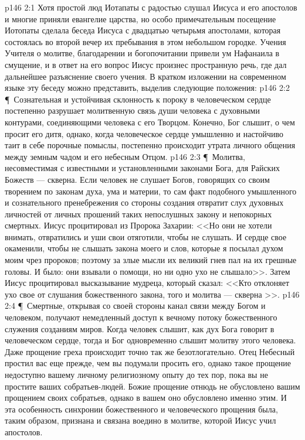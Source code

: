 \vs p146 2:1 Хотя простой люд Иотапаты с радостью слушал Иисуса и его апостолов и многие приняли евангелие царства, но особо примечательным посещение Иотопаты сделала беседа Иисуса с двадцатью четырьмя апостолами, которая состоялась во второй вечер их пребывания в этом небольшом городке. Учения Учителя о молитве, благодарении и богопочитании привели ум Нафанаила в смущение, и в ответ на его вопрос Иисус произнес пространную речь, где дал дальнейшее разъяснение своего учения. В кратком изложении на современном языке эту беседу можно представить, выделив следующие положения:
\vs p146 2:2 \P\ \bibnobreakspace Сознательная и устойчивая склонность к пороку в человеческом сердце постепенно разрушает молитвенную связь души человека с духовными контурами, соединяющими человека с его Творцом. Конечно, Бог слышит, о чем просит его дитя, однако, когда человеческое сердце умышленно и настойчиво таит в себе порочные помыслы, постепенно происходит утрата личного общения между земным чадом и его небесным Отцом.
\vs p146 2:3 \P\ \bibnobreakspace Молитва, несовместимая с известными и установленными законами Бога, для Райских Божеств --- скверна. Если человек не слушает Богов, говорящих со своим творением по законам духа, ума и материи, то сам факт подобного умышленного и сознательного пренебрежения со стороны создания отвратит слух духовных личностей от личных прошений таких непослушных закону и непокорных смертных. Иисус процитировал из Пророка Захарии: <<Но они не хотели внимать, отвратились и уши свои отяготили, чтобы не слушать. И сердце свое окаменили, чтобы не слышать закона моего и слов, которые я посылал духом моим чрез пророков; поэтому за злые мысли их великий гнев пал на их грешные головы. И было: они взывали о помощи, но ни одно ухо не слышало>>. Затем Иисус процитировал высказывание мудреца, который сказал: <<Кто отклоняет ухо свое от слушания божественного закона, того и молитва --- скверна >>.
\vs p146 2:4 \P\ \bibnobreakspace Смертные, открывая со своей стороны канал связи между Богом и человеком, получают немедленный доступ к вечному потоку божественного служения созданиям миров. Когда человек слышит, как дух Бога говорит в человеческом сердце, тогда и Бог одновременно слышит молитву этого человека. Даже прощение греха происходит точно так же безотлогательно. Отец Небесный простил вас еще прежде, чем вы подумали просить его, однако такое прощение недоступно вашему личному религиозному опыту до тех пор, пока вы не простите ваших собратьев\hyp{}людей.  Божие прощение отнюдь не обусловлено вашим прощением своих собратьев, однако в вашем  оно обусловлено именно этим. И эта особенность синхронии божественного и человеческого прощения была, таким образом, признана и связана воедино в молитве, которой Иисус учил апостолов.
